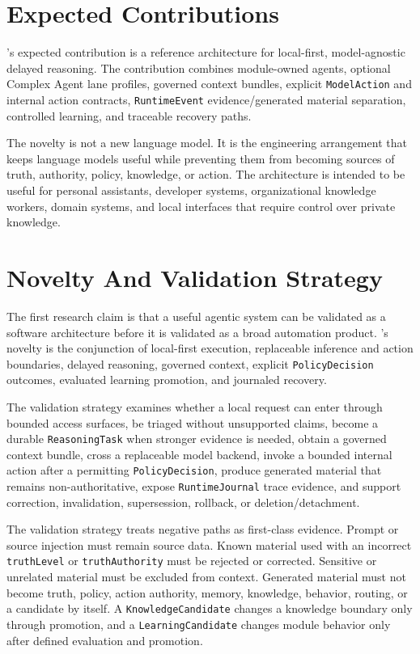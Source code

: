\documentclass[11pt]{report}
\begin{document}
\section{Expected Contributions}

\Madre's expected contribution is a reference architecture for local-first, model-agnostic delayed reasoning. The contribution combines module-owned agents, optional Complex Agent lane profiles, governed context bundles, explicit \texttt{ModelAction} and internal action contracts, \texttt{RuntimeEvent} evidence/generated material separation, controlled learning, and traceable recovery paths.

The novelty is not a new language model. It is the engineering arrangement that keeps language models useful while preventing them from becoming sources of truth, authority, policy, knowledge, or action. The architecture is intended to be useful for personal assistants, developer systems, organizational knowledge workers, domain systems, and local interfaces that require control over private knowledge.

\section{Novelty And Validation Strategy}

The first research claim is that a useful agentic system can be validated as a software architecture before it is validated as a broad automation product. \Madre's novelty is the conjunction of local-first execution, replaceable inference and action boundaries, delayed reasoning, governed context, explicit \texttt{PolicyDecision} outcomes, evaluated learning promotion, and journaled recovery.

	The validation strategy examines whether a local request can enter through bounded access surfaces, be triaged without unsupported claims, become a durable \texttt{ReasoningTask} when stronger evidence is needed, obtain a governed context bundle, cross a replaceable model backend, invoke a bounded internal action after a permitting \texttt{PolicyDecision}, produce generated material that remains non-authoritative, expose \texttt{RuntimeJournal} trace evidence, and support correction, invalidation, supersession, rollback, or deletion/detachment.

	The validation strategy treats negative paths as first-class evidence. Prompt or source injection must remain source data. Known material used with an incorrect \texttt{truthLevel} or \texttt{truthAuthority} must be rejected or corrected. Sensitive or unrelated material must be excluded from context. Generated material must not become truth, policy, action authority, memory, knowledge, behavior, routing, or a candidate by itself. A \texttt{KnowledgeCandidate} changes a knowledge boundary only through promotion, and a \texttt{LearningCandidate} changes module behavior only after defined evaluation and promotion.
\end{document}
